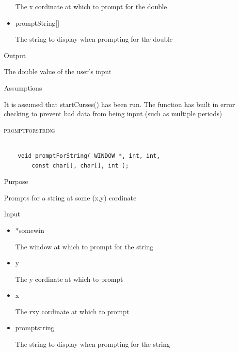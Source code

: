\documentclass[pdftex, 11pt]{article}
\begin{document}
\begin{description}
\begin{description}
\begin{itemize}
						The x cordinate at which to prompt
						for the double

					\item{promptString[]}

						The string to display when prompting for
						the double
						
				\end{itemize}



			\item{Output}

				The double value of the user's input

			\item{Assumptions}

				It is assumed that startCurses() has been run.
				The function has built in error checking to prevent
				bad data from being input (such as multiple periods)

		\end{description}


	\item{\textsc{promptforstring}}

		\begin{lstlisting}

	void promptForString( WINDOW *, int, int, 
		const char[], char[], int );
		\end{lstlisting}

		\begin{description}
			\item{Purpose}

				Prompts for a string at some (x,y) cordinate

			\item{Input}

				\begin{itemize}

					\item{*somewin}

						The window at which to prompt
						for the string

					\item{y}

						The y cordinate at which to prompt

					\item{x}

						The rxy cordinate at which to prompt

					\item{promptstring}

						The string to display when prompting
						for the string


\end{itemize}
\end{description}
\end{description}
\end{document}
